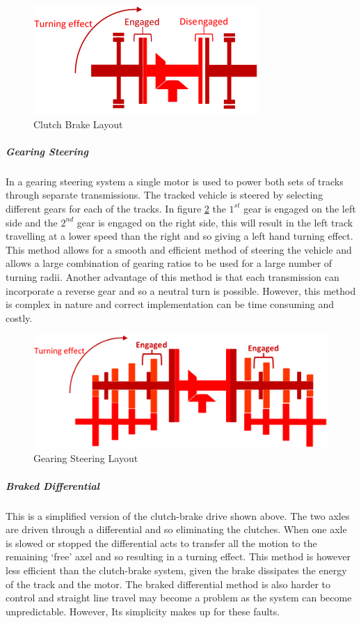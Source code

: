\begin{figure}[h]
\centering\includegraphics[width=0.6\linewidth]{Images/DT_Fig_11.png}
\caption{Clutch Brake Layout}
\label{fig:clutchbrake}
\end{figure}

\subparagraph*{Gearing Steering}

In a gearing steering system a single motor is used to power both sets of tracks through separate transmissions. The tracked vehicle is steered by selecting different gears for each of the tracks. In figure \ref{fig:gearSteer} the $1^{st}$ gear is engaged on the left side and the $2^{nd}$ gear is engaged on the right side, this will result in the left track travelling at a lower speed than the right and so giving a left hand turning effect. This method allows for a smooth and efficient method of steering the vehicle and allows a large combination of gearing ratios to be used for a large number of turning radii. Another advantage of this method is that each transmission can incorporate a reverse gear and so a neutral turn is possible. However, this method is complex in nature and correct implementation can be time consuming and costly.\par

\begin{figure}[h]
\centering\includegraphics[width=0.6\linewidth]{Images/DT_Fig_12.png}
\caption{Gearing Steering Layout}
\label{fig:gearSteer}
\end{figure}

\subparagraph*{Braked Differential}

This is a simplified version of the clutch-brake drive shown above. The two axles are driven through a differential and so eliminating the clutches. When one axle is slowed or stopped the differential acts to transfer all the motion to the remaining ‘free’ axel and so resulting in a turning effect. This method is however less efficient than the clutch-brake system, given the brake dissipates the energy of the track and the motor. The braked differential method is also harder to control and straight line travel may become a problem as the system can become unpredictable. However, Its simplicity makes up for these faults.\par

